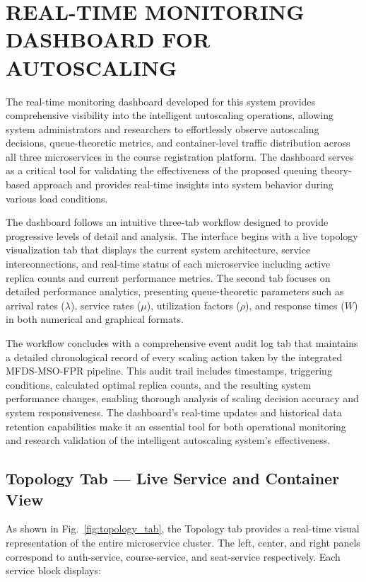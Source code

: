 \pagebreak


\section{\uppercase{Real-Time Monitoring Dashboard for Autoscaling}}

The real-time monitoring dashboard developed for this system provides comprehensive visibility into the intelligent autoscaling operations, allowing system administrators and researchers to effortlessly observe autoscaling decisions, queue-theoretic metrics, and container-level traffic distribution across all three microservices in the course registration platform. The dashboard serves as a critical tool for validating the effectiveness of the proposed queuing theory-based approach and provides real-time insights into system behavior during various load conditions.

The dashboard follows an intuitive three-tab workflow designed to provide progressive levels of detail and analysis. The interface begins with a live topology visualization tab that displays the current system architecture, service interconnections, and real-time status of each microservice including active replica counts and current performance metrics. The second tab focuses on detailed performance analytics, presenting queue-theoretic parameters such as arrival rates ($\lambda$), service rates ($\mu$), utilization factors ($\rho$), and response times ($W$) in both numerical and graphical formats.

The workflow concludes with a comprehensive event audit log tab that maintains a detailed chronological record of every scaling action taken by the integrated MFDS-MSO-FPR pipeline. This audit trail includes timestamps, triggering conditions, calculated optimal replica counts, and the resulting system performance changes, enabling thorough analysis of scaling decision accuracy and system responsiveness. The dashboard's real-time updates and historical data retention capabilities make it an essential tool for both operational monitoring and research validation of the intelligent autoscaling system's effectiveness.

\subsection{Topology Tab --- Live Service and Container View}

As shown in Fig.~\ref{fig:topology_tab}, the Topology tab provides a 
real-time visual representation of the entire microservice cluster. The 
left, center, and right panels correspond to auth-service, course-service, 
and seat-service respectively. Each service block displays:

